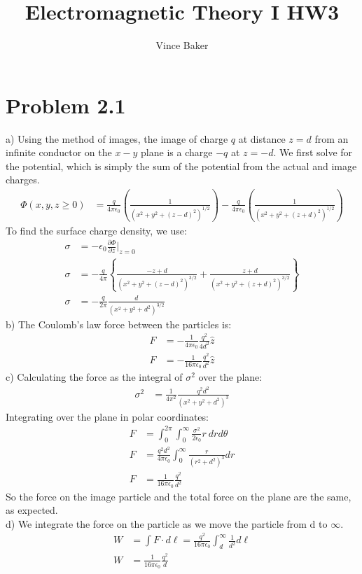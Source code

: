\documentclass[a4paper,11pt]{article}
\title{Electromagnetic Theory I HW3}
\author{Vince Baker}
\numberwithin{equation}{section}
\newcommand{\ez}{\epsilon_0}
\newcommand{\lrp}[1]{\left({#1}\right)}
\newcommand{\lrb}[1]{\left\{{#1}\right\}}
\begin{document}
\maketitle

\section{Problem 2.1}
a) Using the method of images, the image of charge $q$ at distance $z=d$ from an infinite conductor on the $x-y$ plane is a charge $-q$ at $z=-d$.
We first solve for the potential, which is simply the sum of the potential from the actual and image charges.
\begin{align}
 \Phi(x,y,z\ge 0) &= \frac{q}{4\pi\ez}\lrp{\frac{1}{\lrp{x^2+y^2+(z-d)^2}^{1/2}}}-\frac{q}{4\pi\ez}\lrp{\frac{1}{\lrp{x^2+y^2+(z+d)^2}^{1/2}}}
\end{align}
To find the surface charge density, we use:
\begin{align}
 \sigma &= -\ez\frac{\partial \Phi}{\partial z}|_{z=0}\\
 \sigma &= -\frac{q}{4\pi}\lrb{\frac{-z+d}{\lrp{x^2+y^2+(z-d)^2}^{3/2}}+\frac{z+d}{\lrp{x^2+y^2+(z+d)^2}^{3/2}}}\\
 \sigma &= -\frac{q}{2\pi}\frac{d}{\lrp{x^2+y^2+d^2}^{3/2}}
\end{align}
b) The Coulomb's law force between the particles is:
\begin{align}
 F &= -\frac{1}{4\pi\ez}\frac{q^2}{4d^2}\hat{z}\\
 F &= -\frac{1}{16\pi\ez}\frac{q^2}{d^2}\hat{z}
\end{align}
c) Calculating the force as the integral of $\sigma^2$ over the plane:
\begin{align}
 \sigma^2 &= \frac{1}{4\pi^2}\frac{q^2d^2}{\lrp{x^2+y^2+d^2}^3}
\end{align}
Integrating over the plane in polar coordinates:
\begin{align}
 F &= \int_0^{2\pi}\int_0^\infty \frac{\sigma^2}{2\ez} r\ dr d\theta\\
 F &= \frac{q^2d^2}{4\pi\ez}\int_0^\infty \frac{r}{\lrp{r^2+d^2}^3} dr\\
 F &= \frac{1}{16\pi\ez}\frac{q^2}{d^2}
\end{align}
So the force on the image particle and the total force on the plane are the same, as expected.
\\
d) We integrate the force on the particle as we move the particle from d to $\infty$.
\begin{align}
 W &= \int F\cdot d\ell = \frac{q^2}{16\pi\ez}\int_d^\infty \frac{1}{d^2} d\ell\\
 W &= \frac{1}{16\pi\ez}\frac{q^2}{d}
\end{align}
\end{document}
